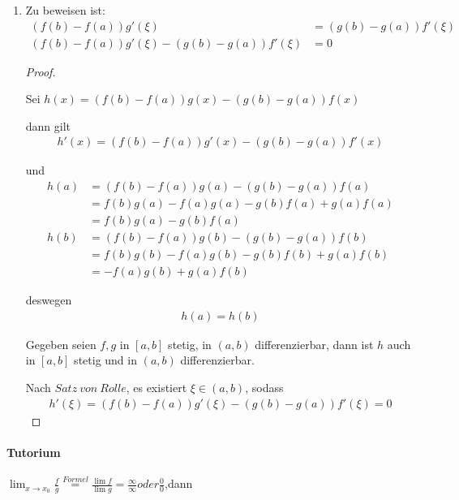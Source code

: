 \begin{enumerate}

\item[]

Zu beweisen ist:
\begin{align*}
(f(b)-f(a))g'(\xi)&=(g(b)-g(a))f'(\xi) \\
(f(b)-f(a))g'(\xi)-(g(b)-g(a))f'(\xi)&=0
\end{align*}

\begin{proof}
$ $\newline

Sei $h(x)=(f(b)-f(a))g(x)-(g(b)-g(a))f(x)$

dann gilt
\begin{align*}
h'(x)=(f(b)-f(a))g'(x)-(g(b)-g(a))f'(x)
\end{align*}

und
\begin{align*}
h(a)
&=(f(b)-f(a))g(a)-(g(b)-g(a))f(a) \\
&=f(b)g(a)-f(a)g(a)-g(b)f(a)+g(a)f(a) \\
&=f(b)g(a)-g(b)f(a) \\
h(b)
&=(f(b)-f(a))g(b)-(g(b)-g(a))f(b) \\
&=f(b)g(b)-f(a)g(b)-g(b)f(b)+g(a)f(b) \\
&=-f(a)g(b)+g(a)f(b)
\end{align*}

deswegen
\begin{align*}
h(a)=h(b)
\end{align*}

Gegeben seien $f,g$ in $[a,b]$ stetig, in $(a,b)$ differenzierbar, dann ist $h$ auch in $[a,b]$ stetig und in $(a,b)$ differenzierbar.

Nach $Satz\ von\ Rolle$, es existiert $\xi\in(a,b)$, sodass
\begin{align*}
h'(\xi)=(f(b)-f(a))g'(\xi)-(g(b)-g(a))f'(\xi)=0
\end{align*}

\end{proof}

\end{enumerate}

\newpage

\paragraph{Tutorium}

$\lim_{x\rightarrow x_0}\frac{f}{g}\overset{Formel}{=}\frac{\lim f}{\lim g}=\frac{\infty}{\infty}oder\frac{0}{0}$,dann

